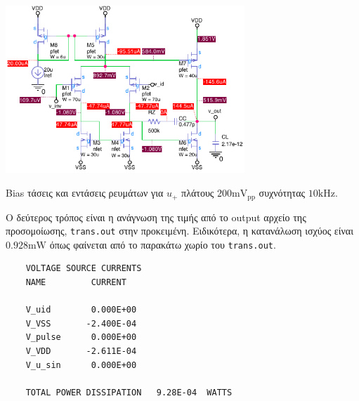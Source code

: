 \begin{circuitfig}[H]
	\centering
	\includegraphics[width=9cm]{op_amp_sim/op_amp_labels.pdf}
	\caption{Bias τάσεις και εντάσεις ρευμάτων για $u_+$ πλάτους $200\unit{\milli\volt}_\mathrm{pp}$ συχνότητας $10\unit{\kilo\hertz}$.}
	\label{circ:op_amp_labels}
\end{circuitfig}

Ο δεύτερος τρόπος είναι η ανάγνωση της τιμής από το output αρχείο της προσομοίωσης, \texttt{trans.out} στην προκειμένη. Ειδικότερα, η κατανάλωση ισχύος είναι $0.928\unit{\milli\watt}$ όπως φαίνεται από το παρακάτω χωρίο του \texttt{trans.out}.\par
\footnotesize{\begin{verbatim}
	VOLTAGE SOURCE CURRENTS
	NAME         CURRENT

	V_uid        0.000E+00
	V_VSS       -2.400E-04
	V_pulse      0.000E+00
	V_VDD       -2.611E-04
	V_u_sin      0.000E+00

	TOTAL POWER DISSIPATION   9.28E-04  WATTS
\end{verbatim}}

